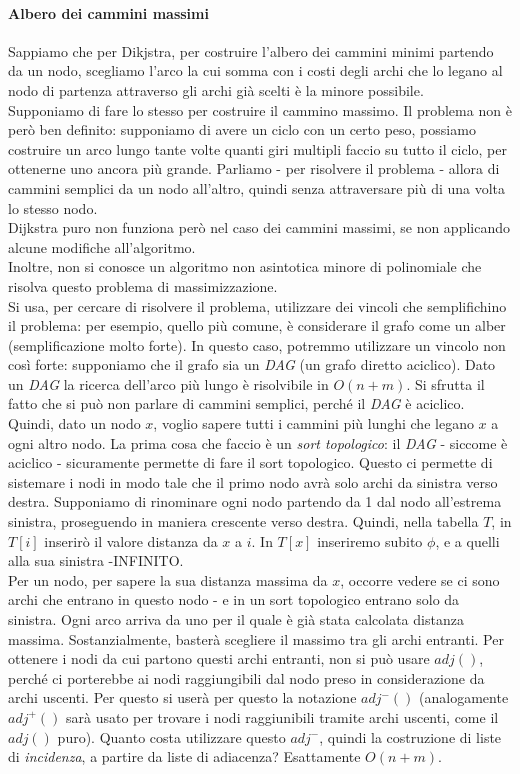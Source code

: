 \paragraph{Albero dei cammini massimi}
Sappiamo che per Dikjstra, per costruire l'albero dei cammini minimi partendo da un nodo, scegliamo l'arco la cui somma con i costi degli archi che lo legano al nodo di partenza attraverso gli archi già scelti è la minore possibile. \\
Supponiamo di fare lo stesso per costruire il cammino massimo. Il problema non è però ben definito: supponiamo di avere un ciclo con un certo peso, possiamo costruire un arco lungo tante volte quanti giri multipli faccio su tutto il ciclo, per ottenerne uno ancora più grande. Parliamo - per risolvere il problema - allora di cammini semplici da un nodo all'altro, quindi senza attraversare più di una volta lo stesso nodo. \\
Dijkstra puro non funziona però nel caso dei cammini massimi, se non applicando alcune modifiche all'algoritmo. \\
Inoltre, non si conosce un algoritmo non asintotica minore di polinomiale che risolva questo problema di massimizzazione. \\
Si usa, per cercare di risolvere il problema, utilizzare dei vincoli che semplifichino il problema: per esempio, quello più comune, è considerare il grafo come un alber (semplificazione molto forte). In questo caso, potremmo utilizzare un vincolo non così forte: supponiamo che il grafo sia un \textit{DAG} (un grafo diretto aciclico). Dato un \textit{DAG} la ricerca dell'arco più lungo è risolvibile in $O(n+m)$. Si sfrutta il fatto che si può non parlare di cammini semplici, perché il \textit{DAG} è aciclico. \\
Quindi, dato un nodo $x$, voglio sapere tutti i cammini più lunghi che legano $x$ a ogni altro nodo.
La prima cosa che faccio è un \textit{sort topologico}: il \textit{DAG} - siccome è aciclico - sicuramente permette di fare il sort topologico. Questo ci permette di sistemare i nodi in modo tale che il primo nodo avrà solo archi da sinistra verso destra. Supponiamo di rinominare ogni nodo partendo da 1 dal nodo all'estrema sinistra, proseguendo in maniera crescente verso destra. Quindi, nella tabella $T$, in $T[i]$ inserirò il valore distanza da $x$ a $i$. In $T[x]$ inseriremo subito $\phi$, e a quelli alla sua sinistra -INFINITO. \\
Per un nodo, per sapere la sua distanza massima da $x$, occorre vedere se ci sono archi che entrano in questo nodo - e in un sort topologico entrano solo da sinistra. Ogni arco arriva da uno per il quale è già stata calcolata distanza massima. Sostanzialmente, basterà scegliere il massimo tra gli archi entranti. Per ottenere i nodi da cui partono questi archi entranti, non si può usare $adj()$, perché ci porterebbe ai nodi raggiungibili dal nodo preso in considerazione da archi uscenti. Per questo si userà per questo la notazione $adj^-()$ (analogamente $adj^+()$ sarà usato per trovare i nodi raggiunibili tramite archi uscenti, come il $adj()$ puro). Quanto costa utilizzare questo $adj^-$, quindi la costruzione di liste di \textit{incidenza}, a partire da liste di adiacenza? Esattamente $O(n+m)$. \\
